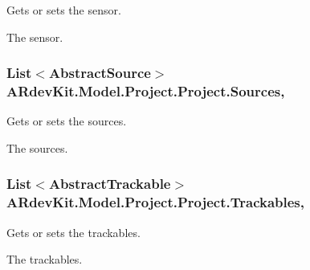 Gets or sets the sensor. 

The sensor. \hypertarget{class_a_rdev_kit_1_1_model_1_1_project_1_1_project_ade6d1eebeab2acee826e2ddf22724fb5}{
\subsubsection[{Sources}]{\setlength{\rightskip}{0pt plus 5cm}List$<${\bf Abstract\-Source}$>$ A\-Rdev\-Kit.\-Model.\-Project.\-Project.\-Sources\hspace{0.3cm}{\ttfamily [get]}, {\ttfamily [set]}}}\label{class_a_rdev_kit_1_1_model_1_1_project_1_1_project_ade6d1eebeab2acee826e2ddf22724fb5}


Gets or sets the sources. 

The sources. \hypertarget{class_a_rdev_kit_1_1_model_1_1_project_1_1_project_af3d7540cfeabb22ce7290378d7039a76}{
\subsubsection[{Trackables}]{\setlength{\rightskip}{0pt plus 5cm}List$<${\bf Abstract\-Trackable}$>$ A\-Rdev\-Kit.\-Model.\-Project.\-Project.\-Trackables\hspace{0.3cm}{\ttfamily [get]}, {\ttfamily [set]}}}\label{class_a_rdev_kit_1_1_model_1_1_project_1_1_project_af3d7540cfeabb22ce7290378d7039a76}


Gets or sets the trackables. 

The trackables. 